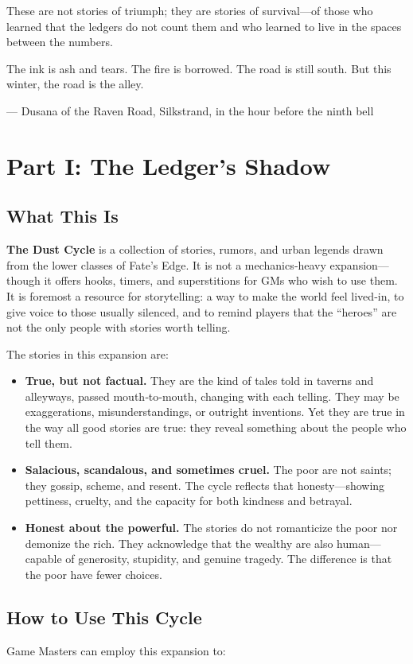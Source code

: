 \documentclass[11pt]{article}
\begin{document}
These are not stories of triumph; they are stories of survival—of those who learned that the ledgers do not count them and who learned to live in the spaces between the numbers.

The ink is ash and tears. The fire is borrowed. The road is still south. But this winter, the road is the alley.

\noindent— Dusana of the Raven Road, Silkstrand, in the hour before the ninth bell


\section{Part I: The Ledger's Shadow}
\subsection{What This Is}
\textbf{The Dust Cycle} is a collection of stories, rumors, and urban legends drawn from the lower classes of Fate’s Edge. It is not a mechanics‑heavy expansion—though it offers hooks, timers, and superstitions for GMs who wish to use them. It is foremost a resource for storytelling: a way to make the world feel lived‑in, to give voice to those usually silenced, and to remind players that the “heroes” are not the only people with stories worth telling.

The stories in this expansion are:

\begin{itemize}
\item \textbf{True, but not factual.} They are the kind of tales told in taverns and alleyways, passed mouth‑to‑mouth, changing with each telling. They may be exaggerations, misunderstandings, or outright inventions. Yet they are true in the way all good stories are true: they reveal something about the people who tell them.
\item \textbf{Salacious, scandalous, and sometimes cruel.} The poor are not saints; they gossip, scheme, and resent. The cycle reflects that honesty—showing pettiness, cruelty, and the capacity for both kindness and betrayal.
\item \textbf{Honest about the powerful.} The stories do not romanticize the poor nor demonize the rich. They acknowledge that the wealthy are also human—capable of generosity, stupidity, and genuine tragedy. The difference is that the poor have fewer choices.
\end{itemize}

\subsection{How to Use This Cycle}
Game Masters can employ this expansion to:
\end{document}
